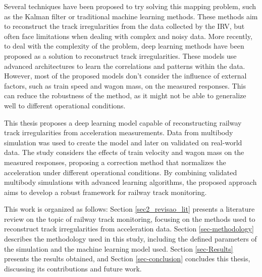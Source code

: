 Several techniques have been proposed to try solving this mapping problem, such as the Kalman filter or traditional machine learning methods. These methods aim to reconstruct the track irregularities from the data collected by the IRV, but often face limitations when dealing with complex and noisy data. More recently, to deal with the complexity of the problem, deep learning methods have been proposed as a solution to reconstruct track irregularities. These models use advanced architectures to learn the correlations and patterns within the data. However, most of the proposed models don't consider the influence of external factors, such as train speed and wagon mass, on the measured responses. This can reduce the robustness of the method, as it might not be able to generalize well to different operational conditions.

This thesis proposes a deep learning model capable of reconstructing railway track irregularities from acceleration measurements. Data from multibody simulation was used to create the model and later on validated on real-world data. The study considers the effects of train velocity and wagon mass on the measured responses, proposing a correction method that normalizes the acceleration under different operational conditions. By combining validated multibody simulations with advanced learning algorithms, the proposed approach aims to develop a robust framework for railway track monitoring.

This work is organized as follows: Section \ref{sec2_revisao_lit} presents a literature review on the topic of railway track monitoring, focusing on the methods used to reconstruct track irregularities from acceleration data. Section \ref{sec-methodology} describes the methodology used in this study, including the defined parameters of the simulation and the machine learning model used. Section \ref{sec-Results} presents the results obtained, and Section \ref{sec-conclusion} concludes this thesis, discussing its contributions and future work.
